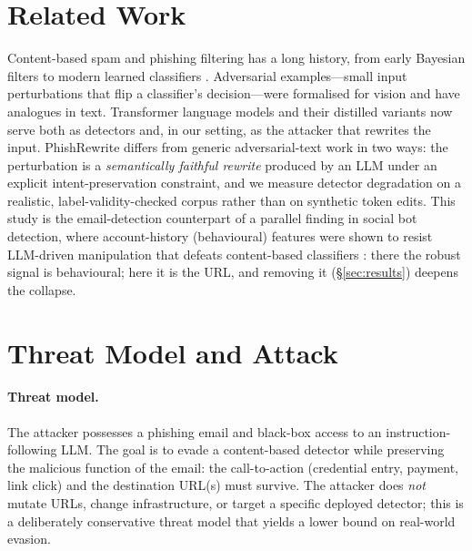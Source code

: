 \documentclass[11pt]{article}
\begin{document}
\section{Related Work}
Content-based spam and phishing filtering has a long history, from early Bayesian
filters to modern learned classifiers \citep{sahami1998bayesian}. Adversarial
examples---small input perturbations that flip a classifier's
decision---were formalised for vision \citep{goodfellow2015explaining} and have
analogues in text. Transformer language models \citep{vaswani2017attention,
devlin2019bert} and their distilled variants \citep{sanh2019distilbert} now serve
both as detectors and, in our setting, as the attacker that rewrites the input.
PhishRewrite differs from generic adversarial-text work in two ways: the
perturbation is a \emph{semantically faithful rewrite} produced by an LLM under an
explicit intent-preservation constraint, and we measure detector degradation on a
realistic, label-validity-checked corpus rather than on synthetic token edits.
This study is the email-detection counterpart of a parallel finding in social bot
detection, where account-history (behavioural) features were shown to resist
LLM-driven manipulation that defeats content-based classifiers
\citep{katyal2026bots}: there the robust signal is behavioural; here it is the URL,
and removing it (\S\ref{sec:results}) deepens the collapse.

\section{Threat Model and Attack}\label{sec:method}
\paragraph{Threat model.} The attacker possesses a phishing email and black-box
access to an instruction-following LLM. The goal is to evade a content-based
detector while preserving the malicious function of the email: the
call-to-action (credential entry, payment, link click) and the destination URL(s)
must survive. The attacker does \emph{not} mutate URLs, change infrastructure, or
target a specific deployed detector; this is a deliberately conservative threat
model that yields a lower bound on real-world evasion.
\end{document}
